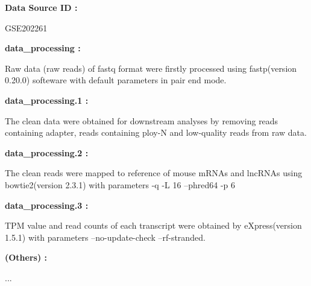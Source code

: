 \documentclass[
]{article}
\begin{document}
\begin{center}\begin{tcolorbox}[colback=gray!10, colframe=gray!50, width=0.9\linewidth, arc=1mm, boxrule=0.5pt]
\textbf{
Data Source ID
:}

\vspace{0.5em}

    GSE202261

\vspace{2em}


\textbf{
data\_processing
:}

\vspace{0.5em}

    Raw data (raw reads) of fastq format were firstly
processed using fastp(version 0.20.0) softeware with
default parameters in pair end mode.

\vspace{2em}


\textbf{
data\_processing.1
:}

\vspace{0.5em}

    The clean data were obtained for downstream analyses by
removing reads containing adapter, reads containing ploy-N
and low-quality reads from raw data.

\vspace{2em}


\textbf{
data\_processing.2
:}

\vspace{0.5em}

    The clean reads were mapped to reference of mouse mRNAs
and lncRNAs using bowtie2(version 2.3.1) with parameters -q
-L 16 --phred64 -p 6

\vspace{2em}


\textbf{
data\_processing.3
:}

\vspace{0.5em}

    TPM value and read counts of each transcript were
obtained by eXpress(version 1.5.1) with parameters
--no-update-check --rf-stranded.

\vspace{2em}


\textbf{
(Others)
:}

\vspace{0.5em}

    ...

\vspace{2em}
\end{tcolorbox}
\end{center}
\end{document}
